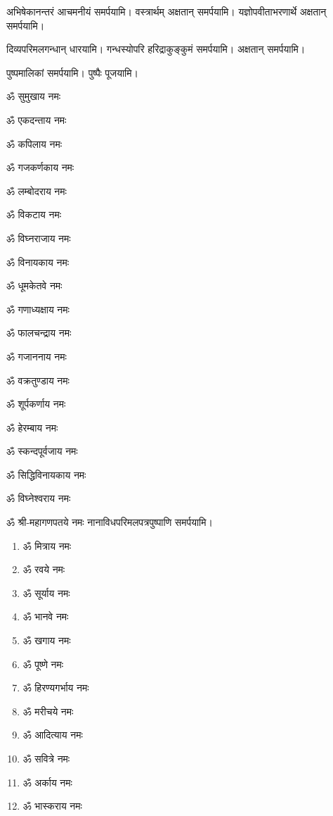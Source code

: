\begin{center}
अभिषेकानन्तरं आचमनीयं समर्पयामि। वस्त्रार्थम् अक्षतान् समर्पयामि। यज्ञोपवीताभरणार्थे अक्षतान् समर्पयामि।

दिव्यपरिमलगन्धान् धारयामि। गन्धस्योपरि हरिद्राकुङ्कुमं समर्पयामि। अक्षतान् समर्पयामि।

पुष्पमालिकां समर्पयामि। पुष्पैः पूजयामि।

\clearpage
{}

\begin{enumerate}%
\begin{minipage}{0.475\linewidth} 
\item ॐ सुमुखाय नमः
\item ॐ एकदन्ताय नमः
\item ॐ कपिलाय नमः
\item ॐ गजकर्णकाय नमः
\item ॐ लम्बोदराय नमः
\item ॐ विकटाय नमः
\item ॐ विघ्नराजाय नमः
\item ॐ विनायकाय नमः
\item ॐ धूमकेतवे नमः
\end{minipage}
\begin{minipage}{0.525\linewidth}
\item ॐ गणाध्यक्षाय नमः
\item ॐ फालचन्द्राय नमः
\item ॐ गजाननाय नमः
\item ॐ वक्रतुण्डाय नमः
\item ॐ शूर्पकर्णाय नमः
\item ॐ हेरम्बाय नमः
\item ॐ स्कन्दपूर्वजाय नमः
\item ॐ सिद्धिविनायकाय नमः
\item ॐ विघ्नेश्वराय नमः
\end{minipage}
\end{enumerate}

ॐ श्री-महागणपतये नमः नानाविधपरिमलपत्रपुष्पाणि समर्पयामि। \medskip

\begin{multicols}{2}
\begin{enumerate}
\item ॐ मित्राय नमः
\item ॐ रवये नमः
\item ॐ सूर्याय नमः
\item ॐ भानवे नमः
\item ॐ खगाय नमः
\item ॐ पूष्णे नमः
\item ॐ हिरण्यगर्भाय नमः
\item ॐ मरीचये नमः
\item ॐ आदित्याय नमः
\item ॐ सवित्रे नमः
\item ॐ अर्काय नमः
\item ॐ भास्कराय नमः


\end{enumerate}
\end{multicols}
\end{center}
